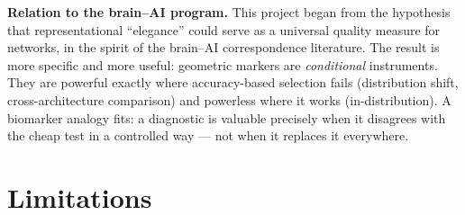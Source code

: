\documentclass[10pt]{article} %
\begin{document}
\textbf{Relation to the brain--AI program.} This project began from the hypothesis that representational ``elegance'' could serve as a universal quality measure for networks, in the spirit of the brain--AI correspondence literature. The result is more specific and more useful: geometric markers are \emph{conditional} instruments. They are powerful exactly where accuracy-based selection fails (distribution shift, cross-architecture comparison) and powerless where it works (in-distribution). A biomarker analogy fits: a diagnostic is valuable precisely when it disagrees with the cheap test in a controlled way --- not when it replaces it everywhere.

\section{Limitations}
\label{sec:limitations}
\end{document}
